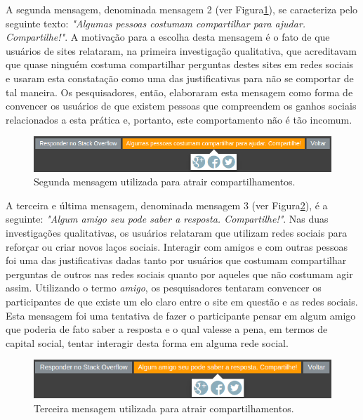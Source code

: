 A segunda mensagem, denominada mensagem 2 (ver Figura\ref{fig:printUmaForca5}), se caracteriza pelo seguinte texto: \textit{"Algumas pessoas costumam compartilhar para ajudar. Compartilhe!"}. A motivação para a escolha desta mensagem é o fato de que usuários de sites \qa relataram, na primeira investigação qualitativa, que acreditavam que quase ninguém costuma compartilhar perguntas destes sites em redes sociais e usaram esta constatação como uma das justificativas para não se comportar de tal maneira. Os pesquisadores, então, elaboraram esta mensagem como forma de convencer os usuários de que existem pessoas que compreendem os ganhos sociais relacionados a esta prática e, portanto, este comportamento não é tão incomum.

    \begin{figure}[H]
        \center
        \includegraphics[scale=0.6]{./figuras/printUmaForca5.png}
        \caption{Segunda mensagem utilizada para atrair compartilhamentos.}
        \label{fig:printUmaForca5}
    \end{figure}

A terceira e última mensagem, denominada mensagem 3 (ver Figura\ref{fig:printUmaForca6}), é a seguinte: \textit{"Algum amigo seu pode saber a resposta. Compartilhe!"}. Nas duas investigações qualitativas, os usuários relataram que utilizam redes sociais para reforçar ou criar novos laços sociais. Interagir com amigos e com outras pessoas foi uma das justificativas dadas tanto por usuários que costumam compartilhar perguntas de outros nas redes sociais quanto por aqueles que não costumam agir assim. Utilizando o termo \textit{amigo}, os pesquisadores tentaram convencer os participantes de que existe um elo claro entre o site \qa em questão e as redes sociais. Esta mensagem foi uma tentativa de fazer o participante pensar em algum amigo que poderia de fato saber a resposta e o qual valesse a pena, em termos de capital social, tentar interagir desta forma em alguma rede social.

    \begin{figure}[H]
        \center
        \includegraphics[scale=0.7]{./figuras/printUmaForca6.png}
        \caption{Terceira mensagem utilizada para atrair compartilhamentos.}
        \label{fig:printUmaForca6}
    \end{figure}

